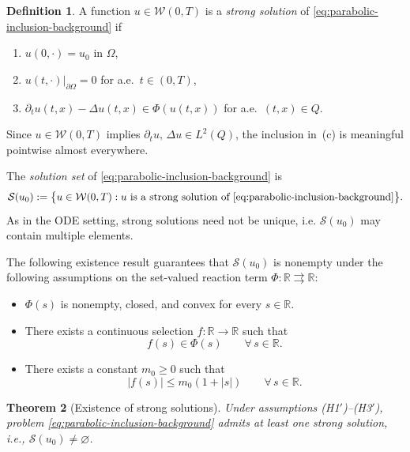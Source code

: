 \documentclass[11pt]{elsarticle}
\newtheorem{theorem}{Theorem}[section]
\theoremstyle{definition}
\newtheorem{definition}[theorem]{Definition}
\theoremstyle{remark}
\numberwithin{equation}{section}
\begin{document}
\begin{definition}\label{def:strong-solution-pde}
	A function $u\in\mathcal{W}(0,T)$ is a \emph{strong solution} of
	\eqref{eq:parabolic-inclusion-background} if
	\begin{enumerate}
		\item[\rm(a)] $u(0,\cdot)=u_0$ in $\Omega$,
		\item[\rm(b)] $u(t,\cdot)|_{\partial\Omega}=0$ for a.e.\ $t\in(0,T)$,
		\item[\rm(c)] $\partial_t u(t,x)-\Delta u(t,x)\in\Phi(u(t,x))$ for
		a.e.\ $(t,x)\in Q$.
	\end{enumerate}
	Since $u\in\mathcal{W}(0,T)$ implies $\partial_t u,\,\Delta u\in L^2(Q)$,
	the inclusion in~(c) is meaningful pointwise almost everywhere.
\end{definition}

The \emph{solution set} of \eqref{eq:parabolic-inclusion-background} is
\begin{equation}\label{eq:solution-PDI}
	\mathcal{S}(u_0)
	:=
	\bigl\{u\in\mathcal{W}(0,T):u\text{ is a strong solution of }
	\eqref{eq:parabolic-inclusion-background}\bigr\}.
\end{equation}
As in the ODE setting, strong solutions need not be unique, i.e. $\mathcal{S}(u_0)$
may contain multiple elements.

The following existence result guarantees that $\mathcal{S}(u_0)$ is
nonempty under the following assumptions on the set-valued reaction term
$\Phi:\mathbb{R}\rightrightarrows\mathbb{R}$:

\begin{itemize}
	\item[(H1$'$)] $\Phi(s)$ is nonempty, closed, and convex for every
	$s\in\mathbb{R}$.
	
	\item[(H2$'$)] There exists a continuous selection
	$f:\mathbb{R}\to\mathbb{R}$ such that
	\[
	f(s)\in\Phi(s)
	\qquad\forall\, s\in\mathbb{R}.
	\]
	
	\item[(H3$'$)] There exists a constant $m_0\ge 0$ such that
	\[
	|f(s)|\le m_0(1+|s|)
	\qquad\forall\, s\in\mathbb{R}.
	\]
\end{itemize}

\begin{theorem}[Existence of strong solutions]
	\label{thm:existence-pde}
	Under assumptions \textup{(H1$'$)--(H3$'$)}, problem
	\eqref{eq:parabolic-inclusion-background}
	admits at least one strong solution, i.e.,
	$\mathcal{S}(u_0)\neq\varnothing$.
\end{theorem}
\end{document}
